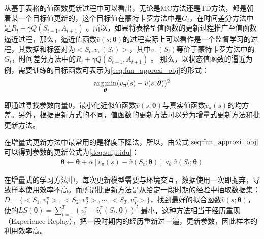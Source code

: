 从基于表格的值函数更新过程中可以看出，无论是MC方法还是TD方法，都是朝着某一个目标值更新的，这个目标值在蒙特卡罗方法中是$G_{t}$，在时间差分方法中是$R_{t}+\gamma Q(S_{t+1},A_{t+1})$
。所以，如果将表格型值函数的更新过程推广至值函数逼近过程，那么，逼近值函数$\hat{v}(s;\bm{\theta})$的过程实际上可以看作是一个监督学习的过程，其数据和标签对为$<S_{t}, v_{\pi}(S_{t})>$，其中$v_{\pi}(S_{t})$等价于蒙特卡罗方法中的$G_{t}$，时间差分方法中的$R_{t}+\gamma Q(S_{t+1},A_{t+1})$
。
那么，以状态值函数的逼近为例，需要训练的目标函数可表示为\eqref{seq:fun_approxi_obj}的形式：
\begin{equation}
\label{seq:fun_approxi_obj}
\begin{aligned}
\operatorname*{arg\,min}_{\bm{\theta}}(v_{\uppi}(s)-\hat{v}(s;\bm{\theta}))^2
\end{aligned}
\end{equation}

即通过寻找参数向量$\bm{\theta}$，最小化近似值函数$\hat{v}(s;\bm{\theta})$与真实值函数$v_{\pi}(s)$的均方差。另外，根据更新方式的不同，值函数的更新方法可以分为增量式更新方法和批更新方法。

在增量式更新方法中最常用的是梯度下降法，所以，由公式$\eqref{seq:fun_approxi_obj}$可以得到参数的更新公式为\eqref{deq:suijitidu}：
\begin{equation}\label{deq:suijitidu}
\begin{aligned}
\bm{\theta} \gets \bm{\theta} + \alpha[v_{\pi}(s)-\hat{v}(S_{t};\bm{\theta})]\triangledown_{\theta} \hat{v}(S_{t};\bm{\theta})
\end{aligned}
\end{equation}



在增量式的学习方法中，每次更新模型需要与环境交互，数据使用一次即抛弃，导致样本使用效率不高。而所谓批更新方法是从给定一段时期的经验中抽取数据集：$D=\{<S_{1},v^{\pi}_{1}>,<S_{2},v^{\pi}_{2}>,\cdots,<S_{T},v^{\pi}_{T}>\}$，找到最好的拟合函数$\hat{v}(s;\bm{\theta})$，使的$LS(\bm{\theta})=\sum_{t=1}^{T}(v^{\pi}_{t}-\hat{v}^{\pi}_{t}(S_{t},\bm{\theta}))^2$ 最小，这种方法相当于经历重现（Experience Replay），把一段时期内的经历重新过一遍，更新参数，因此样本的利用效率高。

